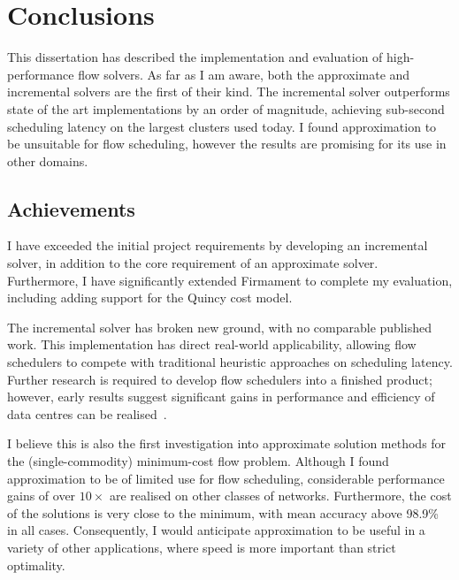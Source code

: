 \chapter{Conclusions}

This dissertation has described the implementation and evaluation of high-performance flow solvers. As far as I am aware, both the approximate and incremental solvers are the first of their kind. The incremental solver outperforms state of the art implementations by an order of magnitude, achieving sub-second scheduling latency on the largest clusters used today. I found approximation to be unsuitable for flow scheduling, however the results are promising for its use in other domains.

\section{Achievements}

I have exceeded the initial project requirements by developing an incremental solver, in addition to the core requirement of an approximate solver. Furthermore, I have significantly extended Firmament to complete my evaluation, including adding support for the Quincy cost model.

The incremental solver has broken new ground, with no comparable published work. This implementation has direct real-world applicability, allowing flow schedulers to compete with traditional heuristic approaches on scheduling latency. Further research is required to develop flow schedulers into a finished product; however, early results suggest significant gains in performance and efficiency of data centres can be realised~\cite{Schwarzkopf:2015}.


I believe this is also the first investigation into approximate solution methods for the (single-commodity) minimum-cost flow problem. Although I found approximation to be of limited use for flow scheduling, considerable performance gains of over $10\times$ are realised on other classes of networks. Furthermore, the cost of the solutions is very close to the minimum, with mean accuracy above 98.9\% in all cases. Consequently, I would anticipate approximation to be useful in a variety of other applications, where speed is more important than strict optimality.

